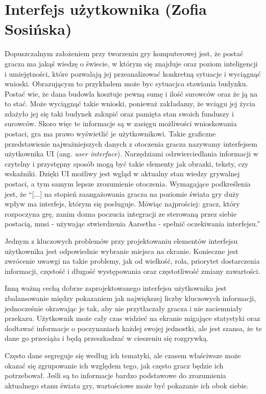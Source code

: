 \section{Interfejs użytkownika (Zofia Sosińska)}\label{c:pasek_war3}

Dopuszczalnym założeniem przy tworzeniu gry komputerowej jest, że postać gracza ma jakąś wiedzę o świecie, w którym się znajduje oraz
poziom inteligencji i umiejętności, które pozwalają jej przeanalizować konkretną sytuacje i wyciągnąć wnioski. Obrazującym to przykładem 
może byc sytuacjca stawiania budynku. Postać wie, że dana budowla kosztuje pewną sumę i ilość surowców oraz że ją na to stać. Może 
wyciągnąć takie wnioski, ponieważ zakładamy, że wciągu jej życia zdażyło jej się taki budynek zakupić oraz pamięta stan swoich funduszy 
i surowców. Skoro więc te informacje są w zasięgu możliwości wnioskowania postaci, gra ma prawo wyświetlić je użytkownikowi. 
Takie graficzne przedstawienie najważniejszych danych z otoczenia gracza nazywamy interfejsem użytkownika UI (ang. \textit{user interface}). Narzędziami odzwierciedlania informacji
w czytelny i przystępny sposób mogą być takie elementy jak obrazki, teksty, czy wskaźniki. Dzięki UI możliwy jest wgląd w aktualny stan wiedzy grywalnej postaci, a tym samym lepsze
zrozumienie otoczenia. Wymagające podkreślenia jest, że “[...] na stopień zaangażowania gracza na poziomie świata gry duży wpływ ma interfejs, którym się posługuje. Mówiąc najprościej:
gracz, który rozpoczyna grę, zanim dozna poczucia integracji ze sterowaną przez siebie postacią, musi - używając stwierdzenia Aarsetha - spełnić oczekiwania interfejsu.”\cite{olbrzymwcieniu}

Jednym z kluczowych problemów przy projektowaniu elementów interfejsu użytkownika jest odpowiednie wybranie miejsca na ekranie. Konieczne jest zwrócenie uwawgi na takie 
problemy, jak od wielkość, rola, priorytet dostarczenia informacji, częstość i długość występowania oraz częstotliwość zmiany zawartości.

Inną ważną cechą dobrze zaprojektowanego interfejsu użytkownika jest zbalansowanie między pokazaniem jak największej liczby kluczowych informacji, 
jednocześnie okrawając je tak, aby nie przytłaczały gracza i nie zaciemniały przekazu. Użytkownik może cały czas widzieć na ekranie migające statystyki
oraz dodtawać informacje o poczynaniach każdej swojej jednostki, ale jest szansa, że te dane go przeciąża i będą przeszkadzać w cieszeniu się rozgrywką. 

Często dane segreguje się według ich tematyki, ale czasem właściwsze może okazać się zgrupowanie ich 
względem tego, jak często gracz będzie ich potrzebował. Jeśli są to informacje bardzo podstawowe do zrozumienia aktualnego 
stanu świata gry, wartościowe może być pokazanie ich obok siebie.


